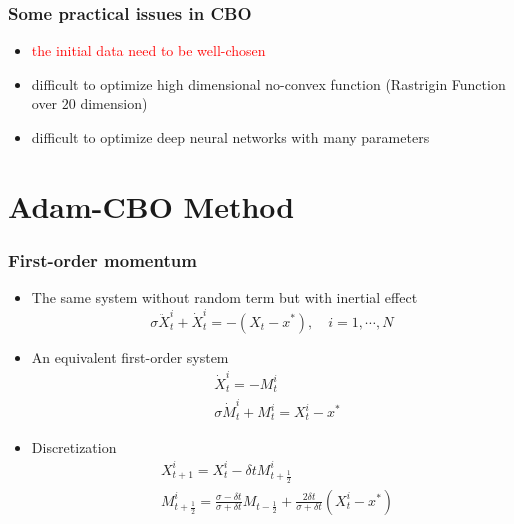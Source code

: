 \documentclass[aspectratio=169]{beamer}
\begin{document}
\begin{frame}
	\frametitle{Some practical issues in CBO}
	\begin{itemize}
		\item \textcolor{red}{the initial data need to be well-chosen}
		\item difficult to optimize high dimensional no-convex function (Rastrigin Function over $20$ dimension)
		\item difficult to optimize deep neural networks with many parameters
	\end{itemize}
\end{frame}
\section{Adam-CBO Method}
\begin{frame}
	\frametitle{First-order momentum}
	
	\begin{itemize}
		\item[] The same system without random term but with inertial effect
		\begin{equation*}
		\sigma \ddot X^i_t + \dot X^i_t = -(X_t- x^*) , \quad i=1,\cdots,N
		\end{equation*}
		\item[] An equivalent first-order system
		\begin{align*}
		&\dot X_t^i = -M_t^i \\
		&\sigma \dot M_t^i + M_t^i = X_t^i - x^*
		\end{align*}
		\item[] Discretization
		\begin{align*}
		&X^i_{t+1} = X_t^i -\delta t M^i_{t+\frac{1}{2}}\\
		&M^i_{t+\frac{1}{2}} = \frac{\sigma - \delta t}{\sigma+ \delta t}M_{t-\frac{1}{2}} + \frac{2\delta t}{\sigma  + \delta t } (X_t^i - x^*)
		\end{align*}
	\end{itemize}

\end{frame}
\end{document}
